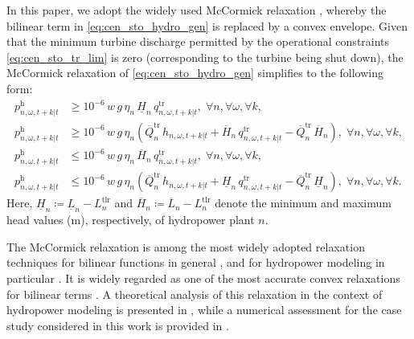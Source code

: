 \documentclass[a4paper,fleqn]{cas-sc}
\begin{document}
In this paper, we adopt the widely used McCormick relaxation \citep{zhang2022long}, whereby the bilinear term in \eqref{eq:cen_sto_hydro_gen} is replaced by a convex envelope.
Given that the minimum turbine discharge permitted by the operational constraints \eqref{eq:cen_sto_tr_lim} is zero (corresponding to the turbine being shut down),
the McCormick relaxation of \eqref{eq:cen_sto_hydro_gen} simplifies to the following form:
\begin{align}
p^{\mathrm{h}}_{n, \omega, t+k|t} & \geq 10^{-6} \, w \, g \, \eta_n \, \underline{H}_{n} \, q^{\mathrm{tr}}_{n, \omega, t+k|t}, \; \forall n, \forall \omega, \forall k, \label{eq:cen_sto_McCormick1}\\
p^{\mathrm{h}}_{n, \omega, t+k|t} & \geq 10^{-6} \, w \, g \, \eta_n \left(\overline{Q}^{\mathrm{tr}}_{n} \, h_{n, \omega, t+k|t} + \overline{H}_{n} \, q^{\mathrm{tr}}_{n, \omega, t+k|t} - \overline{Q}^{\mathrm{tr}}_{n}  \, \overline{H}_{n}\right), \; \forall n, \forall \omega, \forall k, \label{eq:cen_sto_McCormick2}\\
p^{\mathrm{h}}_{n, \omega, t+k|t} & \leq 10^{-6} \, w \, g \, \eta_n \, \overline{H}_{n} \, q^{\mathrm{tr}}_{n, \omega, t+k|t}, \; \forall n, \forall \omega, \forall k, \label{eq:cen_sto_McCormick3}\\
p^{\mathrm{h}}_{n, \omega, t+k|t} & \leq 10^{-6} \, w \, g \, \eta_n \left(\overline{Q}^{\mathrm{tr}}_{n} \, h_{n, \omega, t+k|t} + \underline{H}_{n} \, q^{\mathrm{tr}}_{n, \omega, t+k|t} - \overline{Q}^{\mathrm{tr}}_n \, \underline{H}_{n}\right), \; \forall n, \forall \omega, \forall k. \label{eq:cen_sto_McCormick4}
\end{align}
Here,
$\underline{H}_n \coloneqq \underline{L}_n - L^{\mathrm{tlr}}_n$
and
$\overline{H}_n \coloneqq \overline{L}_n - L^{\mathrm{tlr}}_n$
denote the minimum and maximum head values (m), respectively, of hydropower plant $n$.

The McCormick relaxation is among the most widely adopted relaxation techniques for bilinear functions in general \citep{najman2019tightness}, and for hydropower modeling in particular \citep{shi2024stochastic}.
It is widely regarded as one of the most accurate convex relaxations for bilinear terms \citep{blom2024single}.
A theoretical analysis of this relaxation in the context of hydropower modeling is presented in \cite{flamm2020two}, while a numerical assessment for the case study considered in this work is provided in \cite{11270217}.
\end{document}
